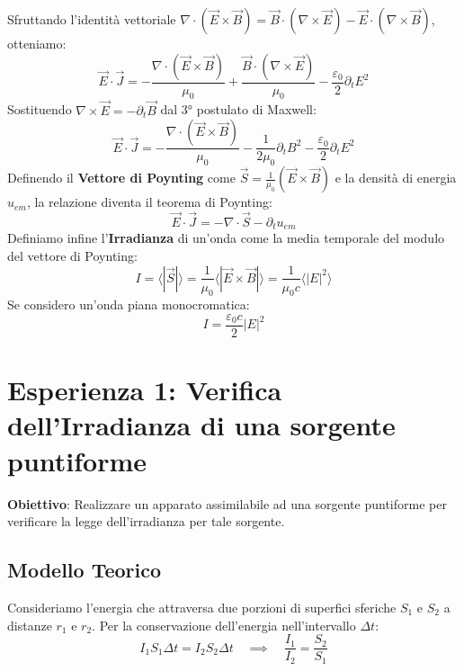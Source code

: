 \documentclass[openany,a4paper,12pt]{book}
\begin{document}
Sfruttando l'identità vettoriale $\nabla \cdot (\vec{E} \times \vec{B}) = \vec{B} \cdot (\nabla \times \vec{E}) - \vec{E} \cdot (\nabla \times \vec{B})$, otteniamo:
\begin{equation}
    \vec{E} \cdot \vec{J} = - \frac{\nabla \cdot (\vec{E} \times \vec{B})}{\mu_0} + \frac{\vec{B} \cdot (\nabla \times \vec{E})}{\mu_0} - \frac{\varepsilon_0}{2} \partial_t E^2
\end{equation}
Sostituendo $\nabla \times \vec{E} = -\partial_t \vec{B}$ dal 3° postulato di Maxwell:
\begin{equation}
    \vec{E} \cdot \vec{J} = - \frac{\nabla \cdot (\vec{E} \times \vec{B})}{\mu_0} - \frac{1}{2\mu_0} \partial_t B^2 - \frac{\varepsilon_0}{2} \partial_t E^2
\end{equation}
Definendo il \textbf{Vettore di Poynting} come $\vec{S} = \frac{1}{\mu_0} (\vec{E} \times \vec{B})$ e la densità di energia $u_{em}$, la relazione diventa il teorema di Poynting:
\begin{equation}
    \vec{E} \cdot \vec{J} = - \nabla \cdot \vec{S} - \partial_t u_{em}
\end{equation}
Definiamo infine l'\textbf{Irradianza} di un'onda come la media temporale del modulo del vettore di Poynting:
\begin{equation}
    I = \langle |\vec{S}| \rangle = \frac{1}{\mu_0} \langle |\vec{E} \times \vec{B}| \rangle = \frac{1}{\mu_0 c} \langle |E|^2 \rangle
\end{equation}
Se considero un'onda piana monocromatica:
\begin{equation}
    I = \frac{\varepsilon_0 c}{2} |E|^2
\end{equation}



\section{Esperienza 1: Verifica dell'Irradianza di una sorgente puntiforme}

\textbf{Obiettivo}: Realizzare un apparato assimilabile ad una sorgente puntiforme per verificare la legge dell'irradianza per tale sorgente.

\subsection*{Modello Teorico}
Consideriamo l'energia che attraversa due porzioni di superfici sferiche $S_1$ e $S_2$ a distanze $r_1$ e $r_2$. Per la conservazione dell'energia nell'intervallo $\Delta t$:
\begin{equation}
    I_1 S_1 \Delta t = I_2 S_2 \Delta t \quad \implies \quad \frac{I_1}{I_2} = \frac{S_2}{S_1}
\end{equation}
\end{document}
